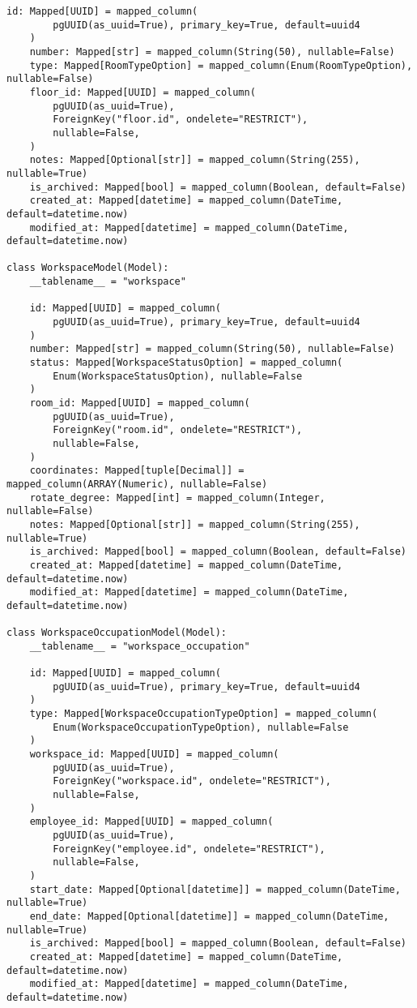 \begin{lstlisting}[style=pythonstyle]
    id: Mapped[UUID] = mapped_column(
        pgUUID(as_uuid=True), primary_key=True, default=uuid4
    )
    number: Mapped[str] = mapped_column(String(50), nullable=False)
    type: Mapped[RoomTypeOption] = mapped_column(Enum(RoomTypeOption), nullable=False)
    floor_id: Mapped[UUID] = mapped_column(
        pgUUID(as_uuid=True),
        ForeignKey("floor.id", ondelete="RESTRICT"),
        nullable=False,
    )
    notes: Mapped[Optional[str]] = mapped_column(String(255), nullable=True)
    is_archived: Mapped[bool] = mapped_column(Boolean, default=False)
    created_at: Mapped[datetime] = mapped_column(DateTime, default=datetime.now)
    modified_at: Mapped[datetime] = mapped_column(DateTime, default=datetime.now)

class WorkspaceModel(Model):
    __tablename__ = "workspace"

    id: Mapped[UUID] = mapped_column(
        pgUUID(as_uuid=True), primary_key=True, default=uuid4
    )
    number: Mapped[str] = mapped_column(String(50), nullable=False)
    status: Mapped[WorkspaceStatusOption] = mapped_column(
        Enum(WorkspaceStatusOption), nullable=False
    )
    room_id: Mapped[UUID] = mapped_column(
        pgUUID(as_uuid=True),
        ForeignKey("room.id", ondelete="RESTRICT"),
        nullable=False,
    )
    coordinates: Mapped[tuple[Decimal]] = mapped_column(ARRAY(Numeric), nullable=False)
    rotate_degree: Mapped[int] = mapped_column(Integer, nullable=False)
    notes: Mapped[Optional[str]] = mapped_column(String(255), nullable=True)
    is_archived: Mapped[bool] = mapped_column(Boolean, default=False)
    created_at: Mapped[datetime] = mapped_column(DateTime, default=datetime.now)
    modified_at: Mapped[datetime] = mapped_column(DateTime, default=datetime.now)

class WorkspaceOccupationModel(Model):
    __tablename__ = "workspace_occupation"

    id: Mapped[UUID] = mapped_column(
        pgUUID(as_uuid=True), primary_key=True, default=uuid4
    )
    type: Mapped[WorkspaceOccupationTypeOption] = mapped_column(
        Enum(WorkspaceOccupationTypeOption), nullable=False
    )
    workspace_id: Mapped[UUID] = mapped_column(
        pgUUID(as_uuid=True),
        ForeignKey("workspace.id", ondelete="RESTRICT"),
        nullable=False,
    )
    employee_id: Mapped[UUID] = mapped_column(
        pgUUID(as_uuid=True),
        ForeignKey("employee.id", ondelete="RESTRICT"),
        nullable=False,
    )
    start_date: Mapped[Optional[datetime]] = mapped_column(DateTime, nullable=True)
    end_date: Mapped[Optional[datetime]] = mapped_column(DateTime, nullable=True)
    is_archived: Mapped[bool] = mapped_column(Boolean, default=False)
    created_at: Mapped[datetime] = mapped_column(DateTime, default=datetime.now)
    modified_at: Mapped[datetime] = mapped_column(DateTime, default=datetime.now)
\end{lstlisting}
